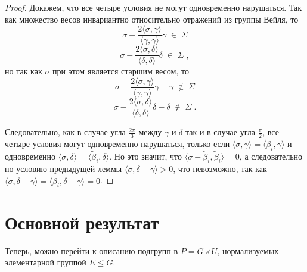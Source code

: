 \documentclass[12pt]{matmex-diploma}
\theoremstyle{mystyleni}
\theoremstyle{mystyle}
\renewcommand{\le}{\leqslant}
\begin{document}
\begin{proof} Докажем, что все четыре условия не могут одновременно нарушаться.
Так как множество весов инвариантно относительно отражений из группы Вейля, то
$$ \sigma - \frac{2 \langle \sigma,\gamma\rangle}{\langle \gamma , \gamma \rangle}\gamma \;\in\; \Sigma $$
$$ \sigma - \frac{2 \langle \sigma,\delta\rangle}{\langle \delta , \delta \rangle}\delta \;\in\; \Sigma \; , $$
но так как $\sigma$ при этом является старшим весом, то
$$ \sigma - \frac{2 \langle \sigma,\gamma\rangle}{\langle \gamma , \gamma \rangle}\gamma-\gamma \;\notin\; \Sigma $$
$$ \sigma - \frac{2 \langle \sigma,\delta\rangle}{\langle \delta , \delta \rangle}\delta-\delta \;\notin\; \Sigma \; . $$

Следовательно, как в случае угла $\frac{2\pi}{3}$ между $\gamma$ и $\delta$ так и в случае угла $\frac{\pi}{2}$, все четыре условия могут одновременно нарушаться, только если $\langle\sigma,\gamma\rangle=\langle\widetilde\beta_i,\gamma\rangle$
и одновременно $\langle\sigma,\delta\rangle=\langle\widetilde\beta_i,\delta\rangle$. Но это значит, что $\langle\sigma-\widetilde\beta_i,\widetilde\beta_i\rangle=0$,
а следовательно по условию предыдущей леммы $\langle\sigma,\delta-\gamma\rangle > 0$, что невозможно, так как $\langle\sigma,\delta-\gamma\rangle = \langle\widetilde\beta_i,\delta-\gamma\rangle = 0$.
\end{proof}

\pagebreak
\section{Основной результат}

Теперь, можно перейти к описанию подгрупп в $P=G\rightthreetimes U$, нормализуемых элементарной группой $E\le G$.
\end{document}
